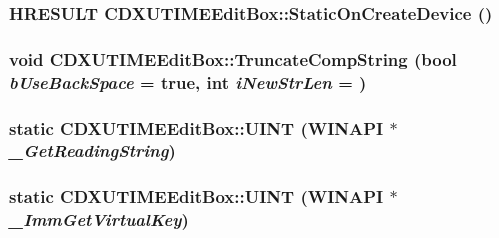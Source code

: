\label{class_c_d_x_u_t_i_m_e_edit_box_ae6c5d46eaaf42af035d3b4dbaa420243}
\hypertarget{class_c_d_x_u_t_i_m_e_edit_box_a6bd5ac93dd74ac14a1e6422d9d549aad}{
\subsubsection[{StaticOnCreateDevice}]{\setlength{\rightskip}{0pt plus 5cm}HRESULT CDXUTIMEEditBox::StaticOnCreateDevice ()}}
\label{class_c_d_x_u_t_i_m_e_edit_box_a6bd5ac93dd74ac14a1e6422d9d549aad}
\hypertarget{class_c_d_x_u_t_i_m_e_edit_box_acf5f110e7519e5aa82ef1e107bfc0613}{
\subsubsection[{TruncateCompString}]{\setlength{\rightskip}{0pt plus 5cm}void CDXUTIMEEditBox::TruncateCompString (bool {\em bUseBackSpace} = {\ttfamily true}, \/  {\bf int} {\em iNewStrLen} = {})}}
\label{class_c_d_x_u_t_i_m_e_edit_box_acf5f110e7519e5aa82ef1e107bfc0613}
\hypertarget{class_c_d_x_u_t_i_m_e_edit_box_af04efdabbdd396a3bee0f746e3248abd}{
\subsubsection[{UINT}]{\setlength{\rightskip}{0pt plus 5cm}static {\bf CDXUTIMEEditBox::UINT} (WINAPI $\ast$ {\em \_\-GetReadingString})}}
\label{class_c_d_x_u_t_i_m_e_edit_box_af04efdabbdd396a3bee0f746e3248abd}
\hypertarget{class_c_d_x_u_t_i_m_e_edit_box_a2a1aec6144102d56aa1ecd8500df4cf1}{
\subsubsection[{UINT}]{\setlength{\rightskip}{0pt plus 5cm}static {\bf CDXUTIMEEditBox::UINT} (WINAPI $\ast$ {\em \_\-ImmGetVirtualKey})}}

